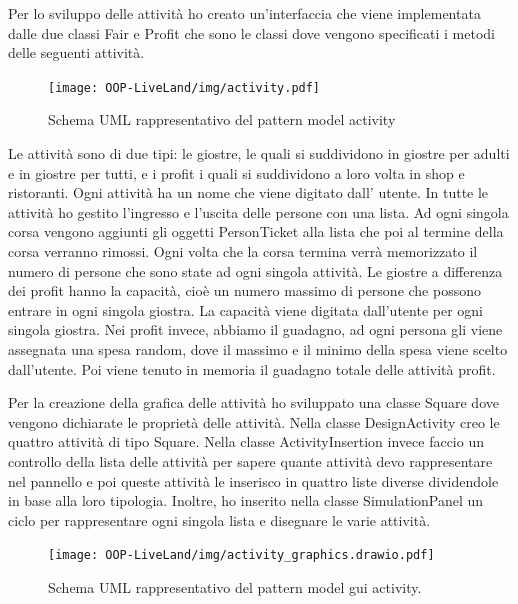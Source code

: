 \documentclass[a4paper,12pt]{report}
\begin{document}
Per lo sviluppo delle attività ho creato un’interfaccia che viene implementata dalle due classi Fair e Profit che sono le classi dove vengono specificati i metodi delle seguenti attività.

\begin{figure}[h]
\centering{}
\texttt{[image: OOP-LiveLand/img/activity.pdf]}
\caption{Schema UML rappresentativo del pattern model activity}
\label{img:activity}
\end{figure}

Le attività sono di due tipi: le giostre, le quali si suddividono in giostre per adulti e in giostre per tutti, e i profit i quali si suddividono a loro volta in shop e ristoranti. Ogni attività ha un nome che viene digitato dall’ utente.
In tutte le attività ho gestito l’ingresso e l’uscita delle persone con una lista. Ad ogni singola corsa vengono aggiunti gli oggetti PersonTicket alla lista che poi al termine della corsa verranno rimossi. Ogni volta che la corsa termina verrà memorizzato il numero di persone che sono state ad ogni singola attività.
Le giostre a differenza dei profit hanno la capacità, cioè un numero massimo di persone che possono entrare in ogni singola giostra. La capacità viene digitata dall’utente per ogni singola giostra.
Nei profit invece, abbiamo il guadagno, ad ogni persona gli viene assegnata una spesa random, dove il massimo e il minimo della spesa viene scelto dall’utente. Poi viene tenuto in memoria il guadagno totale delle attività profit. 

Per la creazione della grafica delle attività ho sviluppato una classe Square dove vengono dichiarate le proprietà delle attività. Nella classe DesignActivity creo le quattro attività di tipo Square. Nella classe ActivityInsertion invece faccio un controllo della lista delle attività per sapere quante attività devo rappresentare nel pannello e poi queste attività le inserisco in quattro liste diverse dividendole in base alla loro tipologia. Inoltre, ho inserito nella classe SimulationPanel un ciclo per rappresentare ogni singola lista e disegnare le varie attività.

\begin{figure}[h]
\centering{}
\texttt{[image: OOP-LiveLand/img/activity\_graphics.drawio.pdf]}
\caption{Schema UML rappresentativo del pattern model gui activity.}
\label{img:activity_graphics}
\end{figure}
\end{document}
